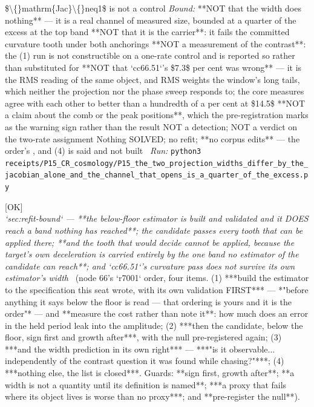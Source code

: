 \begin{description}
\$\textbackslash\{\}mathrm\{Jac\}\textbackslash\{\}neq1\$ is not a control
 \emph{Bound:}  **NOT that the width does nothing** --- it is a real channel of measured size, bounded at a quarter of the excess at the top band  **NOT that it is the carrier**: it fails the committed curvature tooth under both anchorings  **NOT a measurement of the contrast**: the (1) run is not constructible on a one-rate control and is reported so rather than substituted for  **NOT that `cc66.51`'s \$7.3\$ per cent was wrong** --- it is the RMS reading of the same object, and RMS weights the window's long tails, which neither the projection nor the phase sweep responds to; the core measures agree with each other to better than a hundredth of a per cent at \$14.5\$  **NOT a claim about the comb or the peak positions**, which the pre-registration marks as the warning sign rather than the result  NOT a detection; NOT a verdict on the two-rate assignment  Nothing SOLVED; no refit; **no corpus edits** --- the order's , and (4) is said and not built
\ \emph{Run:} \texttt{python3 receipts/P15\_CR\_cosmology/P15\_the\_two\_projection\_widths\_differ\_by\_the\_jacobian\_alone\_and\_the\_channel\_that\_opens\_is\_a\_quarter\_of\_the\_excess.py}
\item[\rcptlabel{P15_the_held_period_estimator_reaches_below_the_floor_and_the_tooth_that_would_decide_cannot_be_applied}{P15R200}\textbf{P15R200}\quad\texttt{P15\_the\_held\_period\_estimator\_reaches\_below\_the\_floor\_and\_the\_tooth\_that\_would\_decide\_cannot\_be\_applied}]\hfill\textsf{[OK]}\\
\textit{`sec:refit-bound` --- **the below-floor estimator is built and validated and it DOES reach a band nothing has reached**; the candidate passes every tooth that can be applied there; **and the tooth that would decide cannot be applied, because the target's own deceleration is carried entirely by the one band no estimator of the candidate can reach**; and `cc66.51`'s curvature pass does not survive its own estimator's width} \ (node 66's `r7001` order, four items. (1) ***build the estimator to the specification this seat wrote, with its own validation FIRST*** --- *"before anything it says below the floor is read --- that ordering is yours and it is the order"* --- and **measure the cost rather than note it**: how much does an error in the held period leak into the amplitude; (2) ***then the candidate, below the floor, sign first and growth after***, with the null pre-registered again; (3) ***and the width prediction in its own right*** --- ***"is it observable... independently of the contrast question it was found while chasing?"***; (4) ***nothing else, the list is closed***.  Guards: **sign first, growth after**; **a width is not a quantity until its definition is named**; ***a proxy that fails where its object lives is worse than no proxy***; and **pre-register the null**). 

\end{description}
